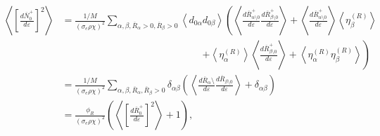 \documentclass[10pt]{article}
\newcommand{\eval}[1]{\left\langle #1 \right\rangle}
\begin{document}
\begin{align}
	\eval{
	\left[\frac{d\overline N_0^+}{d\varepsilon}\right]^2
	}
	&= 
	\frac{1/M}{ (\sigma_e \rho \chi)^2 }
	\sum_{\alpha,\beta ,\overline R_\alpha>0,\overline R_\beta>0}
	\eval{
	d_{0\alpha} 
	d_{0\beta}
	}
	\left(
		\eval{
			\frac{d\overline R_{\alpha \setminus 0}^+}{d\varepsilon}
		\frac{d\overline R_{\beta \setminus 0}^+}{d\varepsilon}
		}
		+
		\eval{\frac{d\overline R_{\alpha \setminus 0}^+}{d\varepsilon}}
		\eval{\eta_{\beta}^{(R)}}
		\right.
		\\
		\nonumber
		&
		\hspace{6cm}
		\left.
		+
		\eval{\eta_{\alpha}^{(R)}}
		\eval{\frac{d\overline R_{\beta \setminus 0}^+}{d\varepsilon}}
		+
		\eval{
		\eta_{\alpha}^{(R)}
		\eta_{\beta}^{(R)}}
	\right)
	\\
	&=
	\frac{1/M}{ (\sigma_e \rho \chi)^2 }
	\sum_{\alpha,\beta,\overline R_\alpha,\overline R_\beta>0}
	\delta_{\alpha\beta}
	\left(
		\eval{
				\frac{d\overline R_\alpha\setminus}{d\varepsilon}
				\frac{d\overline R_{\beta\setminus0}}{d\varepsilon}
		}
		+
		\delta_{\alpha\beta}
	\right)
	\nonumber
	\\
	&=
	\frac{\phi_R}{ (\sigma_e \rho \chi)^2 }
	\left(
		\eval{
			\left[
				\frac{d\overline R_{0}^+}{d\varepsilon}
			\right]^2
		}
		+
		1
	\right)
	,
\end{align}
\end{document}
